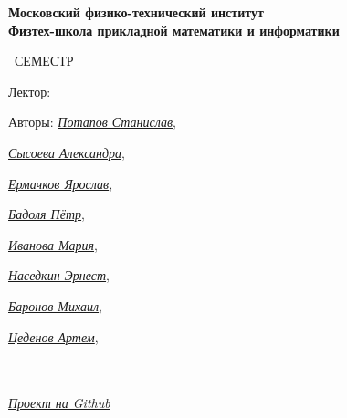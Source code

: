 \begin{titlepage}
	\clearpage\thispagestyle{empty}
	\centering
	
	\textbf{Московский физико-технический институт \\ Физтех-школа прикладной математики и информатики}
	\vspace{33ex}
	
	{\textbf{\FullCourseNameFirstPart}}
	
	\SemesterNumber\ СЕМЕСТР  
	\vspace{1ex}
	
	Лектор: \textit{\LecturerInitials}
	

	\begin{flushright}
		\noindent
		Авторы: \href{https://vk.com/invader17}{\textit{Потапов Станислав}}, 
  
    \href{https://vk.com/salexame}{\textit{ Сысоева Александра}},

    \href{https://vk.com/eryar}{\textit{Ермачков Ярослав}},
    
    \href{https://vk.com/akzium}{\textit{Бадоля Пётр}},
    
    \href{https://vk.com/mivanova1604}{\textit{Иванова Мария}},
    
    \href{https://vk.com/d3voo}{\textit{Наседкин Эрнест}},
    
    \href{https://vk.com/id389655743}{\textit{Баронов Михаил}},

    \href{https://vk.com/darkness11235}{\textit{Цеденов Артем}},
  
		\\ \\
  
		\href{\GithubLink}{\textit{Проект на Github}}
	\end{flushright}
	
	\vfill
	\CourseDate
	\pagebreak
\end{titlepage}
